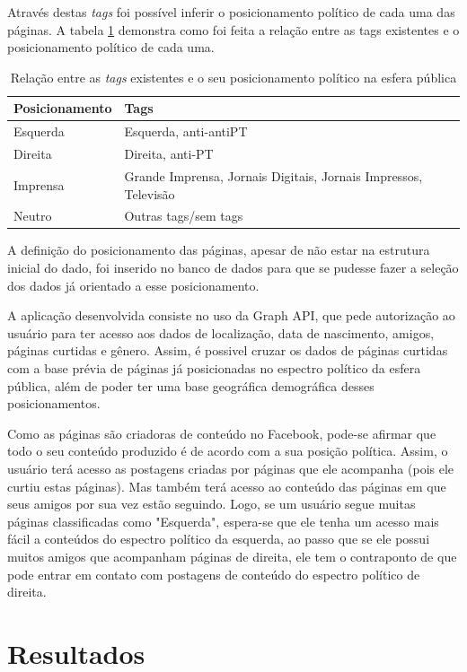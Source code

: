 \documentclass[
	12pt,				%
	oneside,			%
	a4paper,			%
	english,			%
	brazil				%
	]{abntex2ppgsi}
\begin{document}
Através destas \textit{tags} foi possível inferir o posicionamento político de cada uma das páginas. A tabela \ref{tab:tabelaTags} demonstra como foi feita a relação entre as tags existentes e o posicionamento político de cada uma.  

\begin{table}[htbp]
	\centering
	\caption{Relação entre as \textit{tags} existentes e o seu posicionamento político na esfera pública}
		\begin{tabular}{p{2in} p{2in} } \hline
			Posicionamento 	& Tags \\ \hline
			Esquerda		& Esquerda, anti-antiPT \\
			Direita			& Direita, anti-PT \\
			Imprensa		& Grande Imprensa, Jornais Digitais, Jornais Impressos, Televisão \\
			Neutro			& Outras tags/sem tags \\ \hline
		\end{tabular}
		\label{tab:tabelaTags}
\end{table}

A definição do posicionamento das páginas, apesar de não estar na estrutura inicial do dado, foi inserido no banco de dados para que se pudesse fazer a seleção dos dados já orientado a esse posicionamento. 

A aplicação desenvolvida consiste no uso da Graph API, que pede autorização ao usuário para ter acesso aos dados de localização, data de nascimento, amigos, páginas curtidas e gênero. Assim, é possivel cruzar os dados de páginas curtidas com a base prévia de páginas já posicionadas no espectro político da esfera pública, além de poder ter uma base geográfica demográfica desses posicionamentos.

Como as páginas são criadoras de conteúdo no Facebook, pode-se afirmar que todo o seu conteúdo produzido é de acordo com a sua posição política. Assim, o usuário terá acesso as postagens criadas por páginas que ele acompanha (pois ele curtiu estas páginas). Mas também terá acesso ao conteúdo das páginas em que seus amigos por sua vez estão seguindo. Logo, se um usuário segue muitas páginas classificadas como "Esquerda", espera-se que ele tenha um acesso mais fácil a conteúdos do espectro político da esquerda, ao passo que se ele possui muitos amigos que acompanham páginas de direita, ele tem o contraponto de que pode entrar em contato com postagens de conteúdo do espectro político de direita.

\chapter{Resultados}
\label{resultados}
\end{document}
